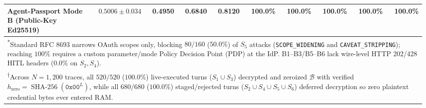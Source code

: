 \documentclass[conference,10pt]{IEEEtran}
\begin{document}
\begin{table}[t]
{\begin{tabular}{lrrrrrrrrr}
\textbf{Agent-Passport Mode B (Public-Key Ed25519)} & $\mathbf{0.5006 \pm 0.034}$ & \textbf{0.4950} & \textbf{0.6840} & \textbf{0.8120} & \textbf{100.0\%} & \textbf{100.0\%} & \textbf{100.0\%} & \textbf{100.0\%} & \textbf{100.0\%} \\
\bottomrule
\multicolumn{10}{l}{\tiny \textsuperscript{*}Standard RFC 8693 narrows OAuth scopes only, blocking $80/160$ ($50.0\%$) of $S_5$ attacks (\texttt{SCOPE\_WIDENING} and \texttt{CAVEAT\_STRIPPING}); reaching $100\%$ requires a custom parameter/mode Policy Decision Point (PDP) at the IdP. B1--B3/B5--B6 lack wire-level HTTP 202/428 HITL headers ($0.0\%$ on $S_2, S_4$).} \\
\multicolumn{10}{l}{\tiny \textsuperscript{$\dagger$}Across $N=1{,}200$ traces, all $520/520$ ($100.0\%$) live-executed turns ($S_1 \cup S_3$) decrypted and zeroized $\mathcal{B}$ with verified $h_{\text{zero}} = \operatorname{SHA-256}(\texttt{0x00}^L)$, while all $680/680$ ($100.0\%$) staged/rejected turns ($S_2 \cup S_4 \cup S_5 \cup S_6$) deferred decryption so zero plaintext credential bytes ever entered RAM.}
\end{tabular}%
}
\end{table}
\end{document}
